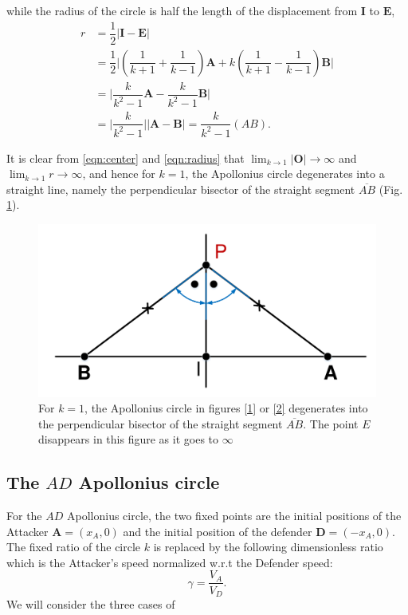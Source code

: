 \documentclass[final,5p,times,twocolumn]{elsarticle}
\begin{document}
while the radius of the circle is half the length of the displacement from $\boldsymbol{I}$ to $\boldsymbol{E}$,
\begin{equation}
\begin{split}
r & =\dfrac{1}{2} \lvert \boldsymbol{I} -\boldsymbol{E}\rvert \\
& = \dfrac{1}{2} \lvert (\dfrac{1}{k+1}+\dfrac{1}{k-1})\boldsymbol{A}+k(\dfrac{1}{k+1}-\dfrac{1}{k-1}) \boldsymbol{B}\rvert \\
& =  \lvert\dfrac{k}{k^{2}-1}\boldsymbol{A} - \dfrac{k}{k^{2}-1} \boldsymbol{B}\rvert\\
& = \lvert\dfrac{k}{k^{2}-1}\rvert \lvert\boldsymbol{A} -\boldsymbol{B}\rvert = \dfrac{k}{k^{2}-1}(AB).
\end{split}
\label{eqn:radius}
\end{equation}

It is clear from \eqref{eqn:center} and \eqref{eqn:radius} that $\lim_{k\to1}\lvert\boldsymbol{O}\rvert\to\infty$ and $\lim_{k\to1}r\to\infty$, and hence for $k=1$, the Apollonius circle degenerates into a straight line, namely the perpendicular bisector of the straight segment $\overline{AB}$ (Fig. \ref{3}).

\begin{figure}[htb]
\centering
\includegraphics[width=0.75\columnwidth]{drawing3.pdf}
\caption{For $k=1$, the Apollonius circle in figures \ref{1} or \ref{2} degenerates into the perpendicular bisector of the straight segment $\overline{AB}$. The point $E$ disappears in this figure as it goes to $\infty$  }
\label{3}
\end{figure}

\subsection{The $AD$ Apollonius circle}
For the $AD$ Apollonius circle, the two fixed points are the initial positions of the Attacker $\boldsymbol{A}=(x_{A},0)$ and the initial position of the defender $\boldsymbol{D}=(-x_{A},0)$. The fixed ratio of the circle $k$ is replaced by the following dimensionless ratio which is the Attacker's speed normalized w.r.t the Defender speed: 
\begin{equation}
\gamma = \dfrac{V_{A}}{V_{D}}.
\end{equation}
We will consider the three cases of 
\end{document}
